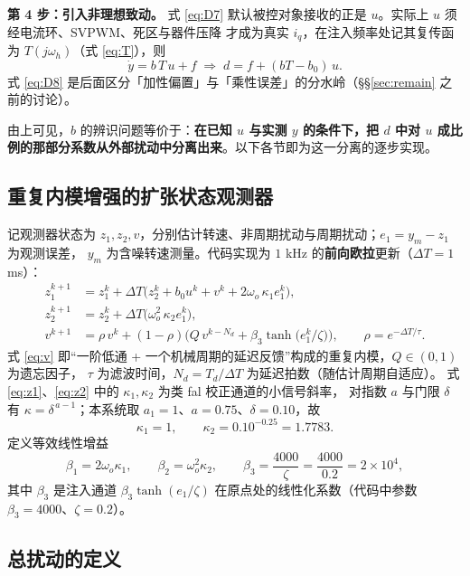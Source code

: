 \documentclass[11pt,a4paper]{ctexart}
\begin{document}
\textbf{第 4 步：引入非理想致动。}
式 \eqref{eq:D7} 默认被控对象接收的正是 $u$。实际上 $u$ 须经电流环、SVPWM、死区与器件压降
才成为真实 $i_q$，在注入频率处记其复传函为 $T(j\omega_h)$（式 \eqref{eq:T}），则
\begin{equation}
\dot y=b\,T\,u+f\;\Longrightarrow\;d=f+(bT-b_0)\,u .
\label{eq:D8}
\end{equation}
式 \eqref{eq:D8} 是后面区分「加性偏置」与「乘性误差」的分水岭（§\S\ref{sec:remain} 之前的讨论）。

由上可见，$b$ 的辨识问题等价于：\textbf{在已知 $u$ 与实测 $y$ 的条件下，把 $d$ 中对 $u$
成比例的那部分系数从外部扰动中分离出来}。以下各节即为这一分离的逐步实现。

\subsection{重复内模增强的扩张状态观测器}

记观测器状态为 $z_1,z_2,v$，分别估计转速、非周期扰动与周期扰动；$e_1=y_m-z_1$ 为观测误差，
$y_m$ 为含噪转速测量。代码实现为 $1$ kHz 的\textbf{前向欧拉}更新（$\Delta T=1$ ms）：
\begin{align}
z_1^{k+1}&=z_1^k+\Delta T\Big(z_2^k+b_0u^k+v^k+2\omega_o\,\kappa_1 e_1^k\Big),\label{eq:z1}\\
z_2^{k+1}&=z_2^k+\Delta T\Big(\omega_o^2\,\kappa_2 e_1^k\Big),\label{eq:z2}\\
v^{k+1}&=\rho\,v^k+(1-\rho)\Big(Q\,v^{k-N_d}+\beta_3\tanh\!\big(e_1^k/\zeta\big)\Big),\qquad \rho=e^{-\Delta T/\tau}.\label{eq:v}
\end{align}
式 \eqref{eq:v} 即“一阶低通 + 一个机械周期的延迟反馈”构成的重复内模，$Q\in(0,1)$ 为遗忘因子，
$\tau$ 为滤波时间，$N_d=T_d/\Delta T$ 为延迟拍数（随估计周期自适应）。
式 \eqref{eq:z1}、\eqref{eq:z2} 中的 $\kappa_1,\kappa_2$ 为类 fal 校正通道的小信号斜率，
对指数 $a$ 与门限 $\delta$ 有 $\kappa=\delta^{\,a-1}$；本系统取 $a_1=1$、$a=0.75$、$\delta=0.10$，故
\begin{equation}
\kappa_1=1,\qquad \kappa_2=0.10^{-0.25}=1.7783 .
\end{equation}
定义等效线性增益
\begin{equation}
\beta_1=2\omega_o\kappa_1,\qquad \beta_2=\omega_o^2\kappa_2,\qquad \beta_3=\frac{4000}{\zeta}=\frac{4000}{0.2}=2\times 10^{4},
\label{eq:betas}
\end{equation}
其中 $\beta_3$ 是注入通道 $\beta_3\tanh(e_1/\zeta)$ 在原点处的线性化系数（代码中参数 $\beta_3=4000$、$\zeta=0.2$）。

\subsection{总扰动的定义}
\end{document}
